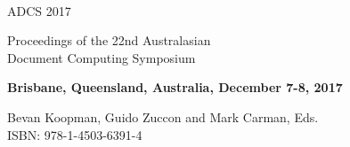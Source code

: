 \documentclass[a4paper]{article}
\begin{document}
\
\vspace{1in}





\begin{center}
\Huge{\sc ADCS 2017}
\end{center}

\vspace{5em}


{\huge \sc Proceedings of the 22nd Australasian \\[.5em] Document Computing Symposium\\[0.5em]}



{ \Large \bf Brisbane, Queensland, Australia, December 7-8, 2017\\[2em]}

{ \Large Bevan Koopman, Guido Zuccon and Mark Carman, Eds.} \\

{\Large ISBN: 978-1-4503-6391-4}



%


\vspace{25pt}
\end{document}
